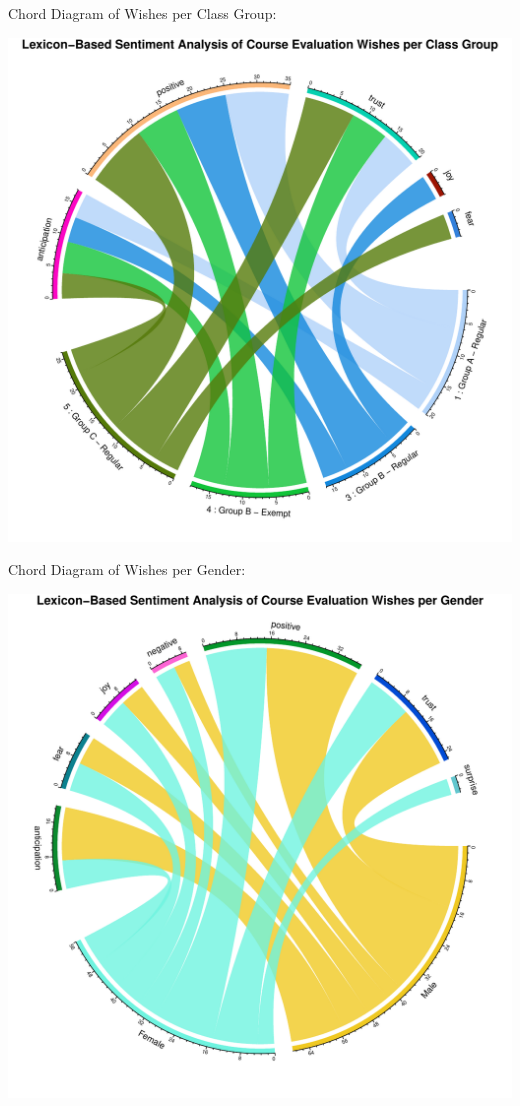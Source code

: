 \documentclass[
]{article}
\begin{document}
\newpage

Chord Diagram of Wishes per Class Group:

\includegraphics{10.b.BBT4206-End-SemesterCourseEvaluation-20230821-20231128-BI2-BBIT4-2_files/figure-latex/ChordDiagramPerGroup_Wishes-1.pdf}

\newpage

Chord Diagram of Wishes per Gender:

\includegraphics{10.b.BBT4206-End-SemesterCourseEvaluation-20230821-20231128-BI2-BBIT4-2_files/figure-latex/ChordDiagramPerGender_Wishes-1.pdf}
\end{document}
